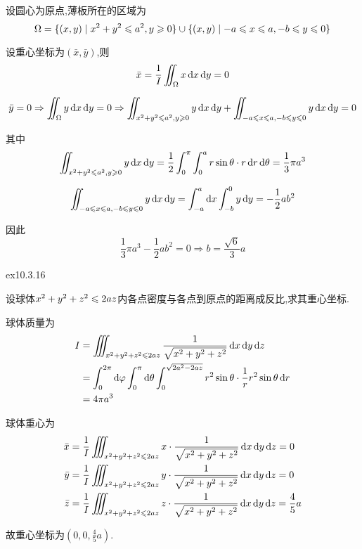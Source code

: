 \begin{solution}
    设圆心为原点,薄板所在的区域为$$\Omega = \{ (x,y) \mid x^2 + y^2 \leqslant a^2, y \geqslant 0 \} \cup \{ (x,y) \mid -a \leqslant x \leqslant a, -b \leqslant y \leqslant 0 \}$$

    设重心坐标为$(\bar x, \bar y)$,则$$\bar x = \frac{1}{I} \iint_{\Omega} x \operatorname{d\!} x \operatorname{d\!} y = 0 $$

    $$\bar y = 0 \Rightarrow \iint_\Omega y \operatorname{d\!} x \operatorname{d\!} y = 0 \Rightarrow \iint_{x^2 + y^2 \leqslant a^2, y \geqslant 0} y \operatorname{d\!} x \operatorname{d\!} y + \iint_{-a \leqslant x \leqslant a, -b \leqslant y \leqslant 0} y \operatorname{d\!} x \operatorname{d\!} y = 0$$

    其中
    $$\iint_{x^2 + y^2 \leqslant a^2, y \geqslant 0} y \operatorname{d\!} x \operatorname{d\!} y = \frac{1}{2} \int_0^{\pi} \int_0^a r \sin \theta \cdot r \operatorname{d\!} r \operatorname{d\!} \theta = \frac13 \pi a^3$$

    $$\iint_{-a \leqslant x \leqslant a, -b \leqslant y \leqslant 0} y \operatorname{d\!} x \operatorname{d\!} y = \int_{-a}^a \operatorname{d\!} x \int_{-b}^0 y \operatorname{d\!} y = -\frac{1}{2} ab^2$$

    因此$$\frac{1}{3} \pi a^3 - \frac12 ab^2 = 0 \Rightarrow b = \frac{\sqrt 6}{3} a$$

\end{solution}

\begin{exercise}
    {ex10.3.16}

    设球体$x^2 + y^2 + z^2 \leqslant 2az$内各点密度与各点到原点的距离成反比,求其重心坐标.
\end{exercise}

\begin{solution}
    球体质量为
    \begin{align*}
        I &= \iiint_{x^2 + y^2 + z^2 \leqslant 2az} \frac{1}{\sqrt{x^2 + y^2 + z^2}} \operatorname{d\!} x \operatorname{d\!} y \operatorname{d\!} z \\
        &= \int_0^{2\pi} \operatorname{d\!} \varphi \int_0^{\pi} \operatorname{d\!} \theta \int_0^{\sqrt{2a^2 - 2az}} r^2 \sin \theta \cdot \frac{1}{r} r^2 \sin \theta \operatorname{d\!} r \\
        &= 4\pi a^3 \\
    \end{align*}

    球体重心为
    \begin{align*}
        \bar x &= \frac{1}{I} \iiint_{x^2 + y^2 + z^2 \les 2az} x \cdot \frac{1}{\sqrt{x^2 + y^2 + z^2}} \dif x \dif y \dif z = 0\\
        \bar y &= \frac{1}{I} \iiint_{x^2 + y^2 + z^2 \les 2az} y \cdot \frac{1}{\sqrt{x^2 + y^2 + z^2}} \dif x \dif y \dif z = 0\\
        \bar z &= \frac{1}{I} \iiint_{x^2 + y^2 + z^2 \les 2az} z \cdot \frac{1}{\sqrt{x^2 + y^2 + z^2}} \dif x \dif y \dif z = \frac{4}{5} a
    \end{align*}

    故重心坐标为$(0, 0, \frac{4}{5} a)$.
\end{solution}

